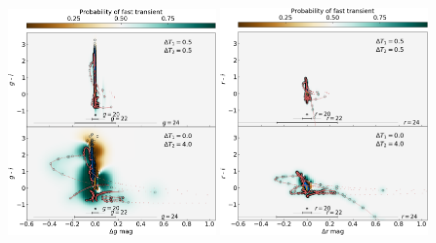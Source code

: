 \documentclass[letterpaper,longauthor,trackchanges,twocolumn,onecolappendix,sort&compress]{aastex62}
\begin{document}
\begin{figure}[!t]
\begin{center}
\includegraphics[width=0.49\textwidth]{figures/FTclassifier_g.png}
\includegraphics[width=0.49\textwidth]{figures/FTclassifier_r.png}

\end{center}
\end{figure}
\end{document}
